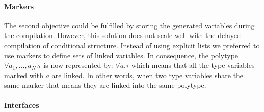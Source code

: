 \documentclass[a4paper]{report}
\begin{document}
\paragraph{Markers} The second objective could be fulfilled by storing the generated variables during the compilation. However, this solution does not scale well with the delayed compilation of conditional structure. Instead of using explicit lists we preferred to use markers to define sets of linked variables. In consequence, the polytype $\forall a_1,\ldots,a_N.\tau$ is now represented by: $\forall a.\tau$ which means that all the type variables marked with $a$ are linked. In other words, when two type variables share the same marker that means they are linked into the same polytype.

\paragraph{Interfaces}
\end{document}
